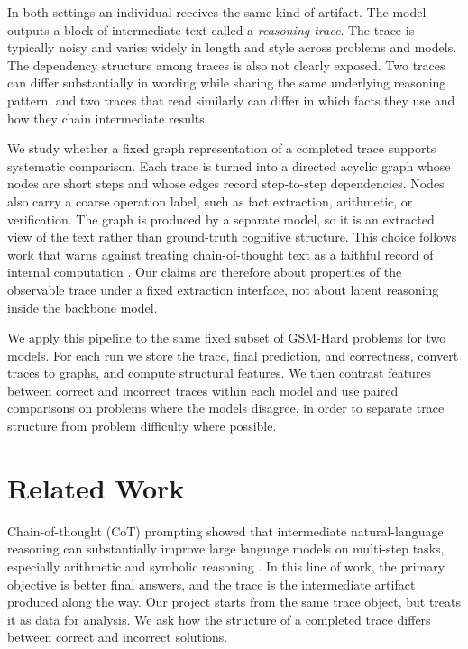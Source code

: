 \documentclass[letterpaper]{article}
\begin{document}
In both settings an individual receives the same kind of artifact. The model outputs a block of intermediate text called a \emph{reasoning trace}. The trace is typically noisy and varies widely in length and style across problems and models. The dependency structure among  traces is also not clearly exposed. Two traces can differ substantially in wording while sharing the same underlying reasoning pattern, and two traces that read similarly can differ in which facts they use and how they chain intermediate results.

We study whether a fixed graph representation of a completed trace supports systematic comparison. Each trace is turned into a directed acyclic graph whose nodes are short steps and whose edges record step-to-step dependencies. Nodes also carry a coarse operation label, such as fact extraction, arithmetic, or verification. The graph is produced by a separate model, so it is an extracted view of the text rather than ground-truth cognitive structure. This choice follows work that warns against treating chain-of-thought text as a faithful record of internal computation \cite{turpin2023unfaithful,lanham2023faithfulness}. Our claims are therefore about properties of the observable trace under a fixed extraction interface, not about latent reasoning inside the backbone model.

We apply this pipeline to the same fixed subset of GSM-Hard problems for two models. For each run we store the trace, final prediction, and correctness, convert traces to graphs, and compute structural features. We then contrast features between correct and incorrect traces within each model and use paired comparisons on problems where the models disagree, in order to separate trace structure from problem difficulty where possible.

\section{Related Work}

Chain-of-thought (CoT) prompting showed that intermediate natural-language reasoning can substantially improve large language models on multi-step tasks, especially arithmetic and symbolic reasoning \cite{wei2022chainofthought}. In this line of work, the primary objective is better final answers, and the trace is the intermediate artifact produced along the way. Our project starts from the same trace object, but treats it as data for analysis. We ask how the structure of a completed trace differs between correct and incorrect solutions.
\end{document}
